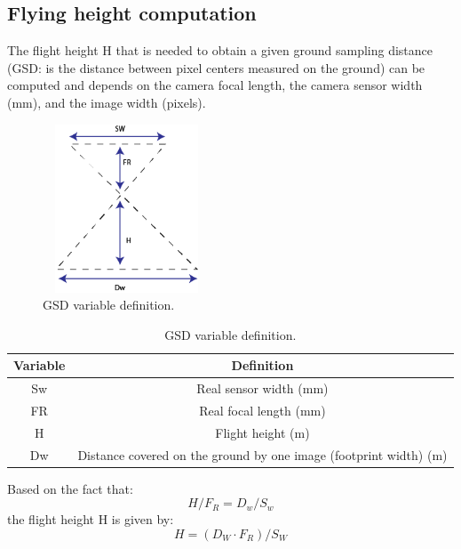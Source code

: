 \subsection{Flying height computation}
The flight height H that is needed to obtain a given ground sampling distance (GSD: is the distance between pixel centers measured on the ground) can be computed and depends on the camera focal length, the camera sensor width  (mm), and the image width (pixels).\cite{GSDComputation}
\begin{figure}[H]
\centering
\includegraphics[width=5cm,height=5cm,keepaspectratio]{imagenes/GSD_Varaible.png}
\caption{GSD variable definition.}
\label{fig:GSD}
\end{figure}
\begin{table}[H]
\centering
\begin{tabular}{|c|c|}
\hline
\textbf{Variable} & \textbf{Definition}                                                                      \\ \hline
Sw                & Real sensor width (mm)                                                                   \\ \hline
FR                & Real focal length (mm)                                                                   \\ \hline
H                 & Flight height (m)                                                                        \\ \hline
Dw                & Distance covered on the ground by one image (footprint width) (m) \\ \hline
\end{tabular}
\caption{GSD variable definition.}
\end{table}
Based on the fact that:
\begin{equation}
H/F_{R} = D_{w}/S_{w}
\end{equation}
the flight height H is given by:
\begin{equation}
H = (D_{W}\cdot F_{R})/S_{W}
\label{H}
\end{equation}
